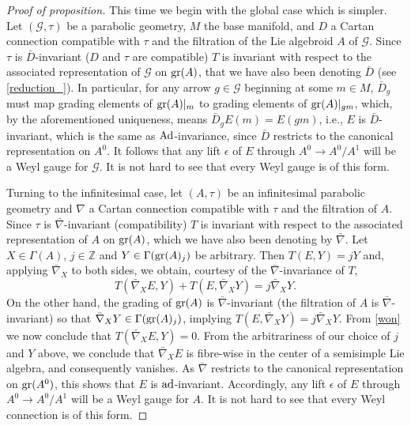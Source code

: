 \documentclass[leqno,12pt]{amsart} %
\begin{document}
\begin{proof}[Proof of proposition]
  This time we begin with the global case which is simpler.  Let $({\mathcal G}, \tau)$ be
  a parabolic geometry, $M$ the base manifold, and $D$ a Cartan connection compatible with
  $\tau $ and the filtration of the Lie algebroid $A$ of $\mathcal G$.  Since $\tau $ is
  $\bar D$-invariant ($D$ and $\tau $ are compatible) $T$ is invariant with respect to the
  associated representation of ${\mathcal G} $ on $\operatorname{\operatorname{gr}}(A)$, that we have also been
  denoting $\bar D $ (see \ref{reduction_}). In particular, for any arrow
  $g \in {\mathcal G} $ beginning at some $m \in M$, $\bar D_g$ must map grading elements
  of $\operatorname{\operatorname{gr}}(A)|_m$ to grading elements of $\operatorname{\operatorname{gr}}(A)|_{gm}$, which, by the
  aforementioned uniqueness, means $\bar D_gE(m) = E(gm)$, i.e., $E$ is
  $\bar D$-invariant, which is the same as $\operatorname{Ad}$-invariance, since ${\bar D}$
  restricts to the canonical representation on $A^0$. It follows that any lift $\epsilon$
  of $E$ through $A^0 \rightarrow A^0/A^1$ will be a Weyl gauge for ${\mathcal G} $. It is
  not hard to see that every Weyl gauge is of this form.

  Turning to the infinitesimal case, let $(A, \tau)$ be an infinitesimal parabolic
  geometry and $\nabla$ a Cartan connection compatible with $\tau $ and the filtration of
  $A$. Since $\tau $ is $\bar\nabla $-invariant (compatibility) $T$ is invariant with
  respect to the associated representation of $A$ on $\operatorname{\operatorname{gr}}(A)$, which we have also been
  denoting by $\bar\nabla $. Let $X \in \Gamma(A)$, $j \in {\mathbb Z} $ and
  $Y \in \Gamma(\operatorname{\operatorname{gr}}(A)_j)$ be arbitrary. Then $T(E, Y) = jY$ and, applying
  $\bar\nabla_X $ to both sides, we obtain, courtesy of the $\bar\nabla$-invariance of
  $T$,
  \begin{equation}
    \label{won}
    T(\bar\nabla_X E, Y) + T(E, \bar\nabla_X Y) = j \bar\nabla_X Y.
  \end{equation}
  On the other hand, the grading of $\operatorname{\operatorname{gr}}(A)$ is $\bar\nabla$-invariant (the filtration
  of $A$ is $\bar\nabla$-invariant) so that $\bar\nabla_X Y \in \Gamma(\operatorname{\operatorname{gr}}(A)_j)$,
  implying $T(E, \bar\nabla_X Y) = j \bar\nabla_X Y$. From \eqref{won} we now conclude
  that $T( \bar\nabla_X E, Y) =0$. From the arbitrariness of our choice of $j$ and $Y$
  above, we conclude that $ \bar\nabla_X E$ is fibre-wise in the center of a semisimple
  Lie algebra, and consequently vanishes. As $\bar\nabla $ restricts to the canonical
  representation on $\operatorname{\operatorname{gr}}(A^0)$, this shows that $E$ is
  $\operatorname{ad}$-invariant. Accordingly, any lift $\epsilon$ of $E$ through
  $A^0 \rightarrow A^0/A^1$ will be a Weyl gauge for $A$. It is not hard to see that every
  Weyl connection is of this form.
\end{proof}
\end{document}
